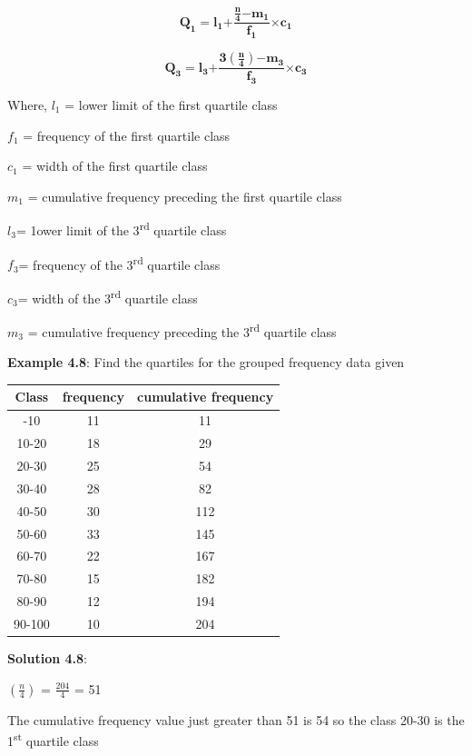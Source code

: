 \documentclass[
]{book}
\begin{document}
\[\mathbf{Q}_{\mathbf{1}}\mathbf{=}\mathbf{l}_{\mathbf{1}}\mathbf{+}\frac{\frac{\mathbf{n}}{\mathbf{4}}\mathbf{-}\mathbf{m}_{\mathbf{1}}}{\mathbf{f}_{\mathbf{1}}}\mathbf{\times}\mathbf{c}_{\mathbf{1}}\]

\[\mathbf{Q}_{\mathbf{3}}\mathbf{=}\mathbf{l}_{\mathbf{3}}\mathbf{+}\frac{\mathbf{3}\left( \frac{\mathbf{n}}{\mathbf{4}} \right)\mathbf{-}\mathbf{m}_{\mathbf{3}}}{\mathbf{f}_{\mathbf{3}}}\mathbf{\times}\mathbf{c}_{\mathbf{3}}\]

Where, \(l_{1}\) = lower limit of the first quartile class

\(f_{1}\) = frequency of the first quartile class

\(c_{1}\) = width of the first quartile class

\(m_{1}\) = cumulative frequency preceding the first quartile class

\(l_{3}\)= 1ower limit of the 3\textsuperscript{rd} quartile class

\(f_{3}\)= frequency of the 3\textsuperscript{rd} quartile class

\(c_{3}\)= width of the 3\textsuperscript{rd} quartile class

\(m_{3}\) = cumulative frequency preceding the 3\textsuperscript{rd} quartile class

\textbf{Example 4.8}: Find the quartiles for the grouped frequency data given

\begin{longtable}[]{@{}ccc@{}}
\toprule\noalign{}
\textbf{Class} & \textbf{frequency} & \textbf{cumulative frequency} \\
\midrule\noalign{}
\endhead
\bottomrule\noalign{}
\endlastfoot
0-10 & 11 & 11 \\
10-20 & 18 & 29 \\
20-30 & 25 & 54 \\
30-40 & 28 & 82 \\
40-50 & 30 & 112 \\
50-60 & 33 & 145 \\
60-70 & 22 & 167 \\
70-80 & 15 & 182 \\
80-90 & 12 & 194 \\
90-100 & 10 & 204 \\
\end{longtable}

\textbf{Solution 4.8}:

\(\left( \frac{n}{4} \right)\) = \(\frac{204}{4}\) = 51

The cumulative frequency value just greater than 51 is 54 so the class
20-30 is the 1\textsuperscript{st} quartile class
\end{document}
